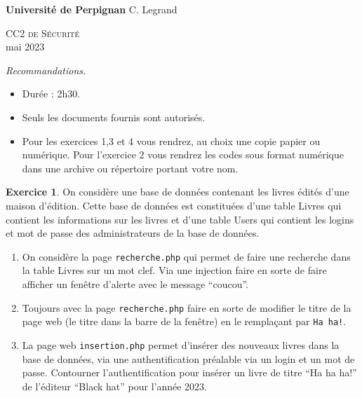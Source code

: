 \documentclass[a4paper,9pt]{article}
\theoremstyle{plain}
\theoremstyle{definition}
\newtheorem{exercice}{Exercice}
\begin{document}
\hbox{}
\noindent \textbf{Université de Perpignan} %
 \hfill C. Legrand \\

\begin{center}
  {  {\scshape \large CC2 de  S\'ecurit\'e}  \\
    mai 2023
}



\end{center}
\hbox{}

\bigskip

\bigskip


\noindent\textit{Recommandations.}
\begin{itemize}
  \item Durée : 2h30. 
\item Seuls les documents fournis sont autorisés.
\item Pour les exercices 1,3 et 4 vous rendrez, au choix une copie papier ou numérique. Pour l'exercice 2 vous rendrez les codes sous format numérique dans une archive ou répertoire portant votre nom. 
\end{itemize}

\bigskip

\begin{exercice}
  On considère une base de données contenant les livres édités d'une maison d'édition. Cette base de données est constituées d'une table Livres qui contient les informations sur les livres et d'une table Users qui contient les logins et mot de passe des administrateurs de la base de données. 
  \begin{enumerate}
  \item On considère la page \verb|recherche.php| qui permet de faire une recherche dans la table Livres sur un mot clef. Via une injection faire en sorte de faire afficher un fenêtre d'alerte avec le message ``coucou''.
    
  \item  Toujours avec la page \verb|recherche.php|  faire en sorte de modifier le titre de la page web (le titre dans la barre de la fenêtre) en le remplaçant par \verb|Ha ha!|.
    
  \item La page web \verb|insertion.php| permet d'insérer des nouveaux livres dans la base de données, via une authentification préalable via un login et un mot de passe. Contourner l'authentification pour insérer un livre  de titre ``Ha ha ha!'' de l'éditeur ``Black hat'' pour l'année 2023. 
    \end{enumerate}
\end{exercice}
\end{document}
